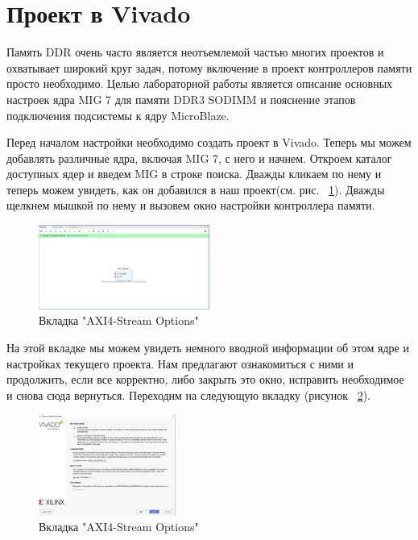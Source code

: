 \documentclass[a4paper,oneside ,14pt]{extreport}
\begin{document}
\section{Проект в Vivado}

Память DDR очень часто является неотъемлемой частью многих проектов и охватывает широкий круг задач, потому включение в проект контроллеров памяти просто необходимо.
Целью лабораторной работы является описание основных настроек ядра MIG 7 для памяти DDR3 SODIMM и пояснение этапов подключения подсистемы к ядру MicroBlaze.

Перед началом настройки необходимо создать проект в Vivado. Теперь мы можем добавлять различные ядра, включая MIG 7, с него и начнем. Откроем каталог доступных ядер и введем MIG в строке поиска. Дважды кликаем по нему и теперь можем увидеть, как он добавился в наш проект(см. рис. ~\ref{mig_0_2}). Дважды щелкнем мышкой по нему и вызовем окно настройки контроллера памяти.

\begin{figure}[h]
	\centering
	\includegraphics[width=0.5\textwidth]{image/mig_0_2.png}
	\caption{Вкладка "AXI4-Stream Options"}
	\label{mig_0_2}
\end{figure}

На этой вкладке мы можем увидеть немного вводной информации об этом ядре и настройках текущего проекта. Нам предлагают ознакомиться с ними и продолжить, если все корректно, либо закрыть это окно, исправить необходимое и снова сюда вернуться. Переходим на следующую вкладку (рисунок ~\ref{mig_1}).

\begin{figure}[h]
	\centering
	\includegraphics[width=0.4\textwidth]{image/mig_1.png}
	\caption{Вкладка "AXI4-Stream Options"}
	\label{mig_1}
\end{figure}
\end{document}
